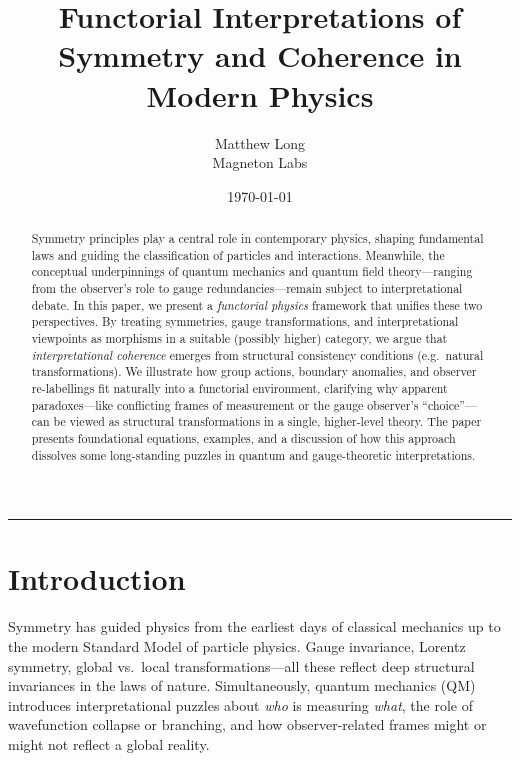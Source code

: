 \documentclass[12pt]{article}
\title{\bf Functorial Interpretations of Symmetry and Coherence in Modern Physics}
\author{Matthew Long \\
Magneton Labs}
\date{\today}
\begin{document}
\maketitle

\begin{abstract}
Symmetry principles play a central role in contemporary physics, shaping fundamental 
laws and guiding the classification of particles and interactions. Meanwhile, the 
conceptual underpinnings of quantum mechanics and quantum field theory---ranging from 
the observer's role to gauge redundancies---remain subject to interpretational debate. 
In this paper, we present a \emph{functorial physics} framework that unifies these 
two perspectives. By treating symmetries, gauge transformations, and interpretational 
viewpoints as morphisms in a suitable (possibly higher) category, we argue that 
\emph{interpretational coherence} emerges from structural consistency conditions 
(e.g.\ natural transformations). We illustrate how group actions, boundary anomalies, 
and observer re-labellings fit naturally into a functorial environment, clarifying 
why apparent paradoxes---like conflicting frames of measurement or the gauge observer's 
``choice''---can be viewed as structural transformations in a single, higher-level 
theory. The paper presents foundational equations, examples, and a discussion of how 
this approach dissolves some long-standing puzzles in quantum and gauge-theoretic 
interpretations.
\end{abstract}

\hrule
\vspace{1em}

\section{Introduction}
Symmetry has guided physics from the earliest days of classical mechanics up to the modern 
Standard Model of particle physics. Gauge invariance, Lorentz symmetry, global vs.\ local 
transformations---all these reflect deep structural invariances in the laws of nature. 
Simultaneously, quantum mechanics (QM) introduces interpretational puzzles about \emph{who} 
is measuring \emph{what}, the role of wavefunction collapse or branching, and how 
observer-related frames might or might not reflect a global reality.
\end{document}
